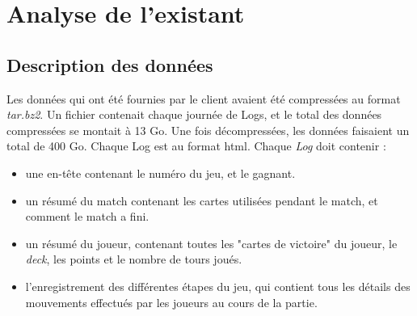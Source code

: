 \chapter{Analyse de l'existant}

\section{Description des données}
Les données qui ont été fournies par le client avaient été compressées au format \textit{tar.bz2}. Un fichier contenait chaque journée de Logs, et le total des données compressées se montait à 13 Go. Une fois décompressées, les données faisaient un total de 400 Go. 
Chaque Log est au format html. 
Chaque \textit{Log} doit contenir : 
\begin{itemize}
\item une en-tête contenant le numéro du jeu, et le gagnant.
\item un résumé du match contenant les cartes utilisées pendant le match, et comment le match a fini.
\item un résumé du joueur, contenant toutes les "cartes de victoire" du joueur, le \textit{deck}, les points et le nombre de tours joués.
\item l'enregistrement des différentes étapes du jeu, qui contient tous les détails des mouvements effectués par les joueurs au cours de la partie.  
\end{itemize}

